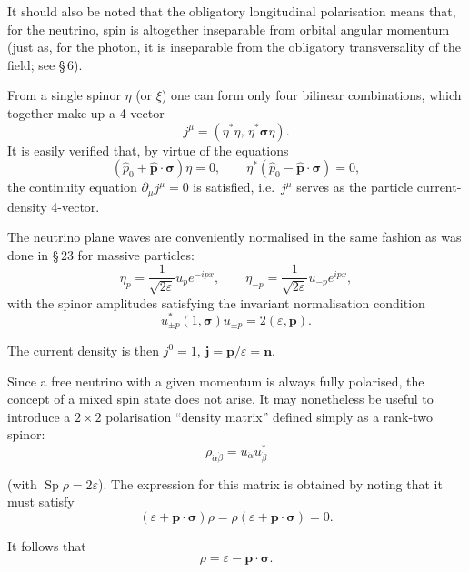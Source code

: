 It should also be noted that the obligatory longitudinal polarisation means that, for the neutrino, spin is altogether inseparable from orbital angular momentum (just as, for the photon, it is inseparable from the obligatory transversality of the field; see \S\,6).

From a single spinor $\eta$ (or $\xi$) one can form only four bilinear combinations, which together make up a 4-vector
\begin{equation}
j^\mu = (\eta^*\eta,\, \eta^*\boldsymbol{\sigma}\eta).
\tag{30.9}
\end{equation}
It is easily verified that, by virtue of the equations
\[
(\widehat p_0 + \widehat{\mathbf{p}}\cdot\boldsymbol{\sigma})\eta = 0,\qquad \eta^*(\widehat p_0 - \widehat{\mathbf{p}}\cdot\boldsymbol{\sigma}) = 0,
\]
the continuity equation $\partial_\mu j^\mu = 0$ is satisfied, i.e.\ $j^\mu$ serves as the particle current-density 4-vector.

The neutrino plane waves are conveniently normalised in the same fashion as was done in \S\,23 for massive particles:
\begin{equation}
\eta_p = \frac{1}{\sqrt{2\varepsilon}}u_p e^{-ipx},\qquad \eta_{-p} = \frac{1}{\sqrt{2\varepsilon}}u_{-p}e^{ipx},
\tag{30.10}
\end{equation}
with the spinor amplitudes satisfying the invariant normalisation condition
\begin{equation}
u^*_{\pm p}(1,\boldsymbol{\sigma})u_{\pm p} = 2(\varepsilon,\mathbf{p}).
\tag{30.11}
\end{equation}

The current density is then $j^0 = 1$, $\mathbf{j} = \mathbf{p}/\varepsilon = \mathbf{n}$.

Since a free neutrino with a given momentum is always fully polarised, the concept of a mixed spin state does not arise. It may nonetheless be useful to introduce a $2 \times 2$ polarisation ``density matrix'' defined simply as a rank-two spinor:
\begin{equation}
\rho_{\dot\alpha\dot\beta} = u_{\dot\alpha}u^*_{\dot\beta}
\tag{30.12}
\end{equation}

(with $\operatorname{Sp}\rho = 2\varepsilon$). The expression for this matrix is obtained by noting that it must satisfy
\[
(\varepsilon + \mathbf{p}\cdot\boldsymbol{\sigma})\rho = \rho(\varepsilon + \mathbf{p}\cdot\boldsymbol{\sigma}) = 0.
\]

It follows that
\begin{equation}
\rho = \varepsilon - \mathbf{p}\cdot\boldsymbol{\sigma}.
\tag{30.13}
\end{equation}

